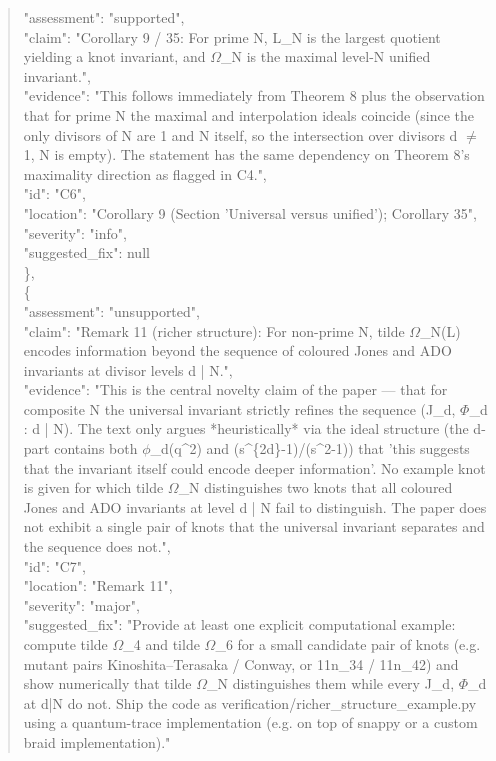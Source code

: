 \documentclass[11pt]{article}
\begin{document}
\begin{quote}
      "assessment": "supported",\\
      "claim": "Corollary 9 / 35: For prime N, L\_N is the largest quotient yielding a knot invariant, and \ensuremath{\Omega}\_N is the maximal level-N unified invariant.",\\
      "evidence": "This follows immediately from Theorem 8 plus the observation that for prime N the maximal and interpolation ideals coincide (since the only divisors of N are 1 and N itself, so the intersection over divisors d \ensuremath{\ne} 1, N is empty). The statement has the same dependency on Theorem 8's maximality direction as flagged in C4.",\\
      "id": "C6",\\
      "location": "Corollary 9 (Section 'Universal versus unified'); Corollary 35",\\
      "severity": "info",\\
      "suggested\_fix": null\\
    \},\\
    \{\\
      "assessment": "unsupported",\\
      "claim": "Remark 11 (richer structure): For non-prime N, tilde \ensuremath{\Omega}\_N(L) encodes information beyond the sequence of coloured Jones and ADO invariants at divisor levels d | N.",\\
      "evidence": "This is the central novelty claim of the paper --- that for composite N the universal invariant strictly refines the sequence (J\_d, \ensuremath{\Phi}\_d : d | N). The text only argues *heuristically* via the ideal structure (the d-part contains both \ensuremath{\phi}\_d(q\^{}2) and (s\^{}\{2d\}-1)/(s\^{}2-1)) that 'this suggests that the invariant itself could encode deeper information'. No example knot is given for which tilde \ensuremath{\Omega}\_N distinguishes two knots that all coloured Jones and ADO invariants at level d | N fail to distinguish. The paper does not exhibit a single pair of knots that the universal invariant separates and the sequence does not.",\\
      "id": "C7",\\
      "location": "Remark 11",\\
      "severity": "major",\\
      "suggested\_fix": "Provide at least one explicit computational example: compute tilde \ensuremath{\Omega}\_4 and tilde \ensuremath{\Omega}\_6 for a small candidate pair of knots (e.g. mutant pairs Kinoshita--Terasaka / Conway, or 11n\_34 / 11n\_42) and show numerically that tilde \ensuremath{\Omega}\_N distinguishes them while every J\_d, \ensuremath{\Phi}\_d at d|N do not. Ship the code as verification/richer\_structure\_example.py using a quantum-trace implementation (e.g. on top of snappy or a custom braid implementation)."\\

\end{quote}
\end{document}

